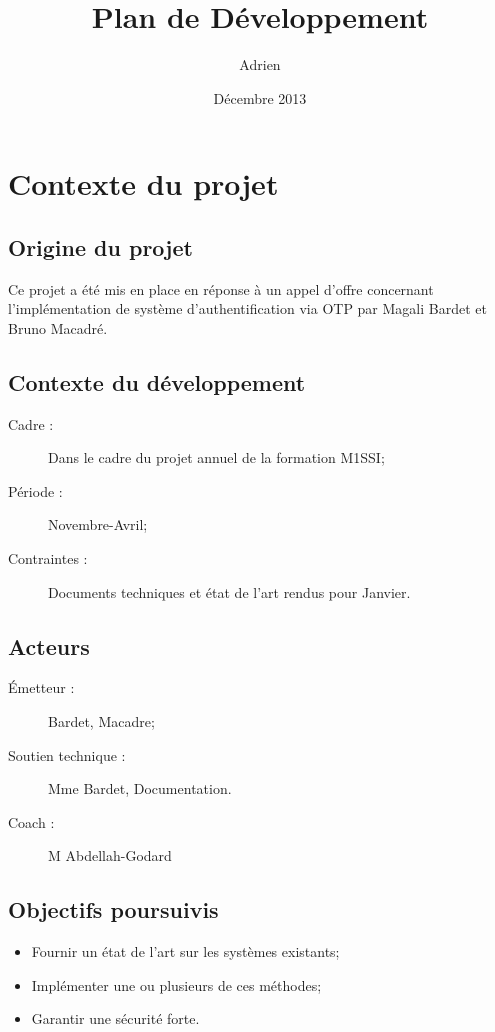 \documentclass{../../res/univ-projet}
\title{Plan de Développement}
\author{Adrien \bsc{Smondack}}
\date{Décembre 2013}
\begin{document}
\maketitle

\section{Contexte du projet}
	\subsection{Origine du projet}
	Ce projet a été mis en place en réponse à un appel d'offre concernant 
	l'implémentation de système d'authentification via OTP par Magali Bardet et 
	Bruno Macadré.
	
	\subsection{Contexte du développement}
	\begin{description} 
		\item [Cadre :] Dans le cadre du projet annuel de la formation M1SSI;
		\item [Période :] Novembre-Avril;
		\item [Contraintes :] Documents techniques et état de l'art rendus pour Janvier.
	\end{description}
	\subsection{Acteurs}
	\begin{description}
		\item [Émetteur :] Bardet, Macadre;
		\item [Soutien technique :] Mme Bardet, Documentation.
		\item [Coach :] M Abdellah-Godard
	\end{description}
	\subsection{Objectifs poursuivis}
	\begin{itemize}
		\item Fournir un état de l'art sur les systèmes existants;
		\item Implémenter une ou plusieurs de ces méthodes;
		\item Garantir une sécurité forte.
	\end{itemize}
\end{document}
